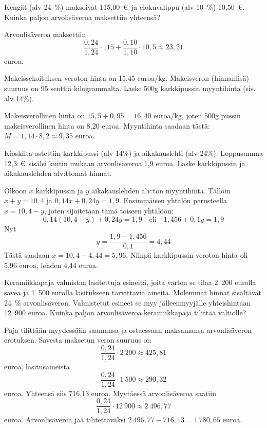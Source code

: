 \documentclass[a4paper,10pt]{article}\usepackage[]{graphicx}\usepackage[]{color}
\begin{document}
\begin{question}
  Kengät (alv 24~\%) maksoivat 115,00~\euro\ ja elokuvalippu (alv 10~\%) 10,50~\euro. Kuinka paljon arvolisäveroa maksettiin yhteensä?
\end{question}
\begin{solution}

  Arvonlisäveroa maksettiin 
  \[
    \frac{0,24}{1,24}\cdot115 + \frac{0,10}{1,10}\cdot10{,}5 
    \approx 23{,}21
  \] euroa.
\end{solution}

\begin{question}
  Makeissekoituksen veroton hinta on 15,45 euroa/kg. Makeisveron (hinnanlisä) suuruus on 95 senttiä kilogrammalta. Laske 500g karkkipussin myyntihinta (sis. alv 14\%).
\end{question}
\begin{solution}
  Makeisverollinen hinta on \(15{,}5+0{,}95 = 16{,}40\) euroa/kg, joten 500g pussin makeisverollinen hinta on 8,20 euroa. Myyntihinta saadaan tästä: \(M = 1,14\cdot8,2\approx9{,}35\) euroa.
\end{solution}



  \begin{question}
  Kioskilta ostettiin karkkipussi (alv 14\%) ja aikakauslehti (alv 24\%). Loppusumma 12{,}3~\euro\ sisälsi kuitin mukaan arvonlisäveroa 1{,}9 euroa. Laske karkkipussin ja aikakauslehden alv:ttomat hinnat.
\end{question}
\begin{solution}
  Olkoon \(x\) karkkipussin ja \(y\) aikakauslehden alv:ton myyntihinta. Tällöin \(x+y = 10{,}4\) ja \(0,14x + 0,24y = 1{,}9\). Ensimmäisen yhtälön perusteella \(x = 10{,}4 - y\), joten sijoitetaan tämä toiseen yhtälöön:
  \[
    0,14(10{,}4-y)+0,24y = 1{,}9 \quad\text{eli}\quad1{,}456 + 0{,}1y = 1{,}9
    \]
  Nyt
  \[
    y = \frac{1{,}9-1{,}456}{0{,}1} = 4{,}44
  \]
  Tästä saadaan \(x = 10{,}4 -4{,}44 = 5{,}96\). Niinpä karkkipussin veroton hinta oli  5{,}96 euroa, lehden 4{,}44 euroa.
\end{solution}


\begin{question}
  Keramiikkapaja valmistaa lasitettuja esineitä, joita varten se tilaa 2~200 eurolla savea ja 1~500 eurolla lasitukseen tarvittavia aineita. Molemmat hinnat sisältävät 24~\% arvonlisäveron. Valmistetut esineet se myy jälleenmyyjälle yhteishintaan 12~900 euroa. Kuinka paljon arvonlisäveroa keramiikkapaja tilittää valtiolle?
\end{question}
\begin{solution}
Paja tilittään myydessään saamansa ja ostaessaan maksamansa arvonlisäveron erotuksen. Savesta maksetun veron suuruus on 
  \[
  \frac{0,24}{1,24}\cdot2~200\approx 425{,}81
  \]
euroa, lasitusaineista 
  \[
  \frac{0,24}{1,24}\cdot1~500\approx290{,}32
  \]
euroa. Yhteensä siis 716{,}13 euroa. Myytäessä arvonlisäveroa saatiin
\[
  \frac{0,24}{1,24}\cdot12~900\approx2~496{,}77
\]
euroa. Arvonlisäveroa jää tilitettäväksi \(2~496{,}77 - 716{,}13 = 1~780{,}65\) euroa.
\end{solution}
\end{document}
